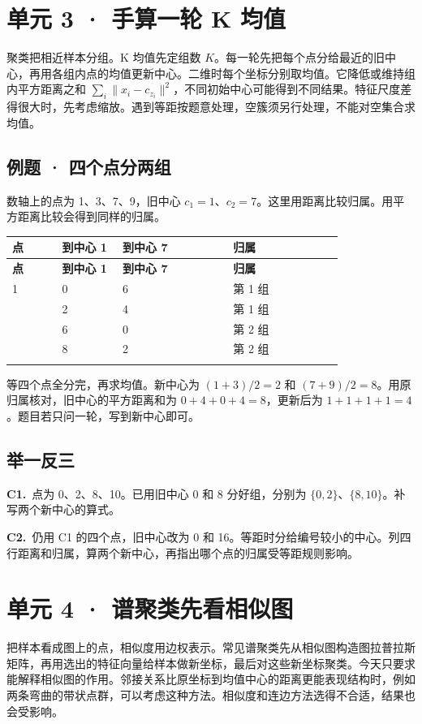 \documentclass[UTF8,a4paper,11pt]{ctexart}
\newcommand{\CompactQuestion}[2]{\par\noindent\textbf{#1.}\ #2\par\vspace{.8em}}
\begin{document}
\section{单元 3 · 手算一轮 K 均值}
聚类把相近样本分组。K 均值先定组数 $K$。每一轮先把每个点分给最近的旧中心，再用各组内点的均值更新中心。二维时每个坐标分别取均值。它降低或维持组内平方距离之和 $\sum_i\|x_i-c_{z_i}\|^2$，不同初始中心可能得到不同结果。特征尺度差得很大时，先考虑缩放。遇到等距按题意处理，空簇须另行处理，不能对空集合求均值。

\subsection{例题 · 四个点分两组}
数轴上的点为 1、3、7、9，旧中心 $c_1=1$、$c_2=7$。这里用距离比较归属。用平方距离比较会得到同样的归属。

{\small\renewcommand{\arraystretch}{1.38}\setlength{\tabcolsep}{3.5pt}
\begin{longtable}{P{0.14\linewidth}P{0.17\linewidth}P{0.31\linewidth}P{0.31\linewidth}}
\toprule
\bfseries 点 & \bfseries 到中心 1 & \bfseries 到中心 7 & \bfseries 归属 \\
\midrule
\endfirsthead
\toprule
\bfseries 点 & \bfseries 到中心 1 & \bfseries 到中心 7 & \bfseries 归属 \\
\midrule
{} & 0 & 6 & 第 1 组 \\
 & 2 & 4 & 第 1 组 \\
 & 6 & 0 & 第 2 组 \\
 & 8 & 2 & 第 2 组 \\
\addlinespace[.35em]
\bottomrule
\end{longtable}
}
等四个点全分完，再求均值。新中心为 $(1+3)/2=2$ 和 $(7+9)/2=8$。用原归属核对，旧中心的平方距离和为 $0+4+0+4=8$，更新后为 $1+1+1+1=4$。题目若只问一轮，写到新中心即可。

\subsection{举一反三}
\CompactQuestion{C1}{点为 0、2、8、10。已用旧中心 0 和 8 分好组，分别为 $\{0,2\}$、$\{8,10\}$。补写两个新中心的算式。}
\CompactQuestion{C2}{仍用 C1 的四个点，旧中心改为 0 和 16。等距时分给编号较小的中心。列四行距离和归属，算两个新中心，再指出哪个点的归属受等距规则影响。}
\clearpage
\section{单元 4 · 谱聚类先看相似图}
把样本看成图上的点，相似度用边权表示。常见谱聚类先从相似图构造图拉普拉斯矩阵，再用选出的特征向量给样本做新坐标，最后对这些新坐标聚类。今天只要求能解释相似图的作用。邻接关系比原坐标到均值中心的距离更能表现结构时，例如两条弯曲的带状点群，可以考虑这种方法。相似度和连边方法选得不合适，结果也会受影响。
\end{document}
